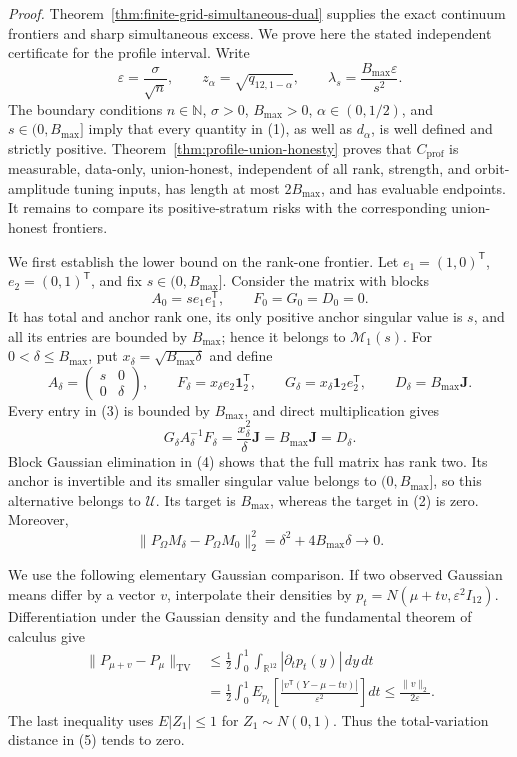 \textit{Proof.}
Theorem~\ref{thm:finite-grid-simultaneous-dual} supplies the exact continuum frontiers and sharp simultaneous excess.  We prove here the stated independent certificate for the profile interval.  Write
\[
 \varepsilon=\frac{\sigma}{\sqrt n},\qquad
 z_\alpha=\sqrt{q_{12,1-\alpha}},\qquad
 \lambda_s=\frac{B_{\max}\varepsilon}{s^2}.
\tag{1}
\]
The boundary conditions \(n\in\mathbb N\), \(\sigma>0\), \(B_{\max}>0\), \(\alpha\in(0,1/2)\), and \(s\in(0,B_{\max}]\) imply that every quantity in (1), as well as \(d_\alpha\), is well defined and strictly positive.  Theorem~\ref{thm:profile-union-honesty} proves that \(C_{\mathrm{prof}}\) is measurable, data-only, union-honest, independent of all rank, strength, and orbit-amplitude tuning inputs, has length at most \(2B_{\max}\), and has evaluable endpoints.  It remains to compare its positive-stratum risks with the corresponding union-honest frontiers.

We first establish the lower bound on the rank-one frontier.  Let \(e_1=(1,0)^{\mathsf T}\), \(e_2=(0,1)^{\mathsf T}\), and fix \(s\in(0,B_{\max}]\).  Consider the matrix with blocks
\[
 A_0=se_1e_1^{\mathsf T},\qquad F_0=G_0=D_0=0.
\tag{2}
\]
It has total and anchor rank one, its only positive anchor singular value is \(s\), and all its entries are bounded by \(B_{\max}\); hence it belongs to \(\mathcal M_1(s)\).  For \(0<\delta\leq B_{\max}\), put \(x_\delta=\sqrt{B_{\max}\delta}\) and define
\[
 A_\delta=\begin{pmatrix}s&0\\0&\delta\end{pmatrix},\qquad
 F_\delta=x_\delta e_2\mathbf1_2^{\mathsf T},\qquad
 G_\delta=x_\delta\mathbf1_2e_2^{\mathsf T},\qquad
 D_\delta=B_{\max}\mathbf J.
\tag{3}
\]
Every entry in (3) is bounded by \(B_{\max}\), and direct multiplication gives
\[
 G_\delta A_\delta^{-1}F_\delta
 =\frac{x_\delta^2}{\delta}\mathbf J
 =B_{\max}\mathbf J=D_\delta.
\tag{4}
\]
Block Gaussian elimination in (4) shows that the full matrix has rank two.  Its anchor is invertible and its smaller singular value belongs to \((0,B_{\max}]\), so this alternative belongs to \(\mathcal U\).  Its target is \(B_{\max}\), whereas the target in (2) is zero.  Moreover,
\[
 \lVert P_\Omega M_\delta-P_\Omega M_0\rVert_2^2
 =\delta^2+4B_{\max}\delta\longrightarrow0.
\tag{5}
\]

We use the following elementary Gaussian comparison.  If two observed Gaussian means differ by a vector \(v\), interpolate their densities by \(p_t=N(\mu+tv,\varepsilon^2I_{12})\).  Differentiation under the Gaussian density and the fundamental theorem of calculus give
\[
 \begin{split}
 \lVert P_{\mu+v}-P_\mu\rVert_{\mathrm{TV}}
 &\leq\frac12\int_0^1\int_{\mathbb R^{12}}|\partial_tp_t(y)|\,dy\,dt\\
 &=\frac12\int_0^1E_{p_t}\left[
 \frac{|v^{\mathsf T}(Y-\mu-tv)|}{\varepsilon^2}\right]dt
 \leq\frac{\lVert v\rVert_2}{2\varepsilon}.
 \end{split}
\tag{6}
\]
The last inequality uses \(E|Z_1|\leq1\) for \(Z_1\sim N(0,1)\).  Thus the total-variation distance in (5) tends to zero.

